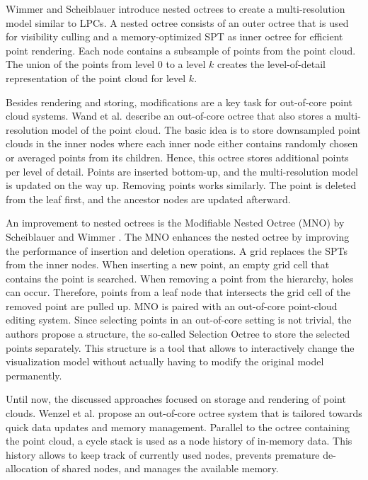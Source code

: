 \par

Wimmer and Scheiblauer \cite{wimmer2006instant} introduce nested octrees to create a multi-resolution model similar to LPCs. A nested octree consists of an outer octree that is used for visibility culling and a memory-optimized SPT as inner octree for efficient point rendering. Each node contains a subsample of points from the point cloud. The union of the points from level 0 to a level $k$ creates the level-of-detail representation of the point cloud for level $k$. 

\par

Besides rendering and storing, modifications are a key task for out-of-core point cloud systems. Wand et al. \cite{wand2007interactive} describe an out-of-core octree that also stores a multi-resolution model of the point cloud. The basic idea is to store downsampled point clouds in the inner nodes where each inner node either contains randomly chosen or averaged points from its children. Hence, this octree stores additional points per level of detail. Points are inserted bottom-up, and the multi-resolution model is updated on the way up. Removing points works similarly. The point is deleted from the leaf first, and the ancestor nodes are updated afterward. 

\par

An improvement to nested octrees is the Modifiable Nested Octree (MNO) by Scheiblauer and Wimmer \cite{scheiblauer2011out}. The MNO enhances the nested octree by improving the performance of insertion and deletion operations. A grid replaces the SPTs from the inner nodes. When inserting a new point, an empty grid cell that contains the point is searched. When removing a point from the hierarchy, holes can occur. Therefore, points from a leaf node that intersects the grid cell of the removed point are pulled up. MNO is paired with an out-of-core point-cloud editing system. Since selecting points in an out-of-core setting is not trivial, the authors propose a structure, the so-called Selection Octree to store the selected points separately. This structure is a tool that allows to interactively change the visualization model without actually having to modify the original model permanently. 

\par

Until now, the discussed approaches focused on storage and rendering of point clouds. Wenzel et al. \cite{wenzel2014out} propose an out-of-core octree system that is tailored towards quick data updates and memory management. Parallel to the octree containing the point cloud, a cycle stack is used as a node history of in-memory data. This history allows to keep track of currently used nodes, prevents premature de-allocation of shared nodes, and manages the available memory. 


